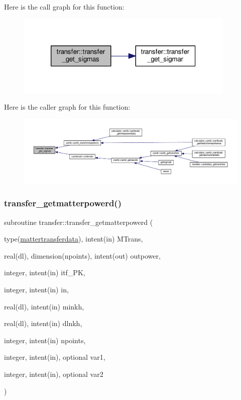 Here is the call graph for this function\+:
\nopagebreak
\begin{figure}[H]
\begin{center}
\leavevmode
\includegraphics[width=296pt]{namespacetransfer_a94b4673ba4b74ac5aef785afde714446_cgraph}
\end{center}
\end{figure}
Here is the caller graph for this function\+:
\nopagebreak
\begin{figure}[H]
\begin{center}
\leavevmode
\includegraphics[width=350pt]{namespacetransfer_a94b4673ba4b74ac5aef785afde714446_icgraph}
\end{center}
\end{figure}
\mbox{\label{namespacetransfer_aec77f610696b7445e8c8e070491ca238}} 
\subsubsection{\texorpdfstring{transfer\+\_\+getmatterpowerd()}{transfer\_getmatterpowerd()}}
{\footnotesize\ttfamily subroutine transfer\+::transfer\+\_\+getmatterpowerd (\begin{DoxyParamCaption}\item[{type(\mbox{\hyperlink{structtransfer_1_1mattertransferdata}{mattertransferdata}}), intent(in)}]{M\+Trans,  }\item[{real(dl), dimension(npoints), intent(out)}]{outpower,  }\item[{integer, intent(in)}]{itf\+\_\+\+PK,  }\item[{integer, intent(in)}]{in,  }\item[{real(dl), intent(in)}]{minkh,  }\item[{real(dl), intent(in)}]{dlnkh,  }\item[{integer, intent(in)}]{npoints,  }\item[{integer, intent(in), optional}]{var1,  }\item[{integer, intent(in), optional}]{var2 }\end{DoxyParamCaption})}



